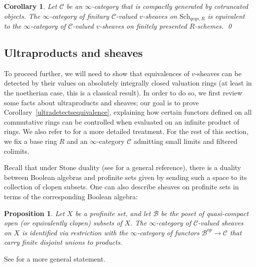 \documentclass[reqno]{amsart}
\newtheorem{proposition}[theorem]{Proposition}
\newtheorem{corollary}[theorem]{Corollary}
\theoremstyle{definition}
\begin{document}
\begin{corollary} 
\label{finitaryv}
Let $\mathcal{C}$ be an $\infty$-category that is compactly generated by cotruncated objects. 
The $\infty$-category of finitary $\mathcal{C}$-valued $v$-sheaves on $\mathrm{Sch}_{qcqs,R}$ is
equivalent to the $\infty$-category of $\mathcal{C}$-valued $v$-sheaves on finitely
presented $R$-schemes. 
\qed
\end{corollary} 




\subsection{Ultraproducts and sheaves}
\label{ultraprod}

To proceed further, we will need to show that  equivalences of $v$-sheaves can
be detected by their values on absolutely integrally closed valuation rings (at
least in the noetherian case, this is a classical result). In order to do so, we
first review some facts about ultraproducts and sheaves; our goal is to prove
Corollary~\ref{ultradetectsequivalence}, explaining how certain functors defined
on all commutative rings can be controlled when evaluated on an infinite product
of rings. We also refer to \cite{Jardine} for a more detailed treatment.  For the rest of this section, we fix a base ring $R$ and an $\infty$-category $\mathcal{C}$ admitting small limits and filtered colimits. 


Recall that under Stone duality (see \cite{Johnstone} for a general reference),
there is a duality between Boolean algebras and profinite sets given by sending such a space to its collection of clopen subsets. One can also
describe sheaves on profinite sets in terms of the corresponding Boolean algebra:

\begin{proposition}
\label{SheafStone}
Let $X$ be a profinite set, and let $\mathcal{B}$ be the poset of quasi-compact
open (or equivalently clopen) subsets of $X$. The $\infty$-category of
$\mathcal{C}$-valued sheaves on $X$ is identified via restriction with the
$\infty$-category of functors $\mathcal{B}^{op} \to \mathcal{C}$ that carry finite disjoint unions to products.
\end{proposition}
See \cite[Corollary 1.1.4.5]{SAG} for a more general statement. 
\end{document}
